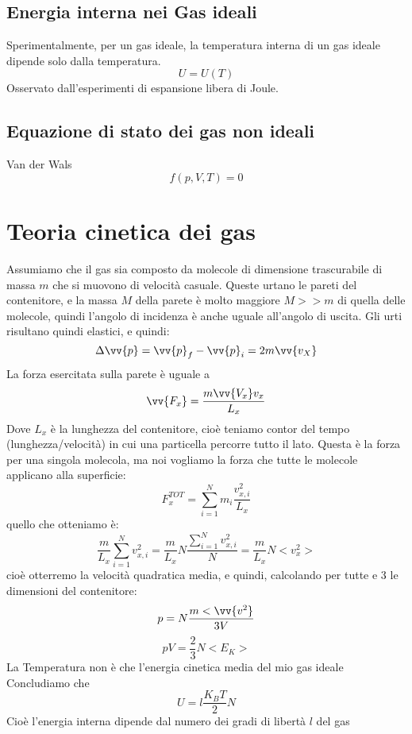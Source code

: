 \documentclass[a4paper]{report}
\begin{document}
  \subsection{Energia interna nei Gas ideali}
  Sperimentalmente, per  un gas ideale, la temperatura interna di un gas ideale dipende solo dalla temperatura.
  $$ U = U(T) $$
  Osservato dall'esperimenti di espansione libera di Joule.
  \subsection{Equazione di stato dei gas non ideali}
  Van der Wals
  $$ f(p,V,T) = 0 $$

  \section{Teoria cinetica dei gas}
  Assumiamo che il gas sia composto da molecole di dimensione trascurabile di massa $m$ che si muovono di velocità casuale. Queste urtano le pareti del contenitore, e la massa $M$ della parete è molto maggiore $M>>m$ di quella delle molecole, quindi l'angolo di incidenza è anche uguale all'angolo di uscita. Gli urti risultano quindi elastici, e quindi:
  $$ \Delta \vv{p} = \vv{p}_f - \vv{p}_i = 2 m\vv{v_X}$$
  La forza esercitata sulla parete è uguale a
  $$ \vv{F_x} = \frac{m \vv{V_x} v_x}{L_x}$$
  Dove $L_x$ è la lunghezza del contenitore, cioè teniamo contor del tempo (lunghezza/velocità) in cui una particella percorre tutto il lato. Questa è la forza per una singola molecola, ma noi vogliamo la forza che tutte le molecole applicano alla superficie:
  $$ F_x^{TOT} = \sum_{i=1}^N m_i \frac{v_{x,i}^2}{L_x}$$
  quello che otteniamo è:
  $$\frac{m}{L_x} \sum_{i=1}^N v_{x,i}^2 = \frac{m}{L_x} N \frac{\sum_{i=1}^N v_{x,i}^2}{N} = \frac{m}{L_x}N <v_x^2>$$
  cioè otterremo la velocità quadratica media, e quindi, calcolando per tutte e 3 le dimensioni del contenitore:
  $$p = N \frac{m <\vv{v^2}}{3V}$$
  $$pV = \frac{2}{3} N <E_K>$$
  La Temperatura non è che l'energia cinetica media del mio gas ideale
  Concludiamo che
  $$ U = l \frac{K_B T}{2} N$$
  Cioè l'energia interna dipende dal numero dei gradi di libertà $l$ del gas
\end{document}
